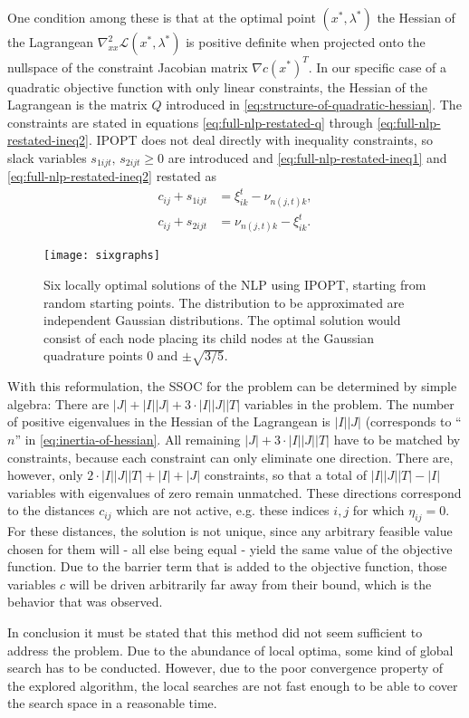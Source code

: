 One condition among these is that at the optimal point $\left(x^*,\lambda^*\right)$ the Hessian of the Lagrangean $\nabla_{xx}^2\mathcal{L}(x^*,\lambda^*)$ is positive definite when projected onto the nullspace of the constraint Jacobian matrix $\nabla c(x^*)^T$. In our specific case of a quadratic objective function with only linear constraints, the Hessian of the Lagrangean is the matrix $Q$ introduced in \eqref{eq:structure-of-quadratic-hessian}. The constraints are stated in equations \eqref{eq:full-nlp-restated-q} through \eqref{eq:full-nlp-restated-ineq2}. IPOPT does not deal directly with inequality constraints, so slack variables $s_{1ijt},\,s_{2ijt} \geq 0$ are introduced and \eqref{eq:full-nlp-restated-ineq1} and \eqref{eq:full-nlp-restated-ineq2} restated as
\begin{subequations}
\begin{align}
  \label{eq:nlp-ineq1-with-slacks}
  c_{ij} +s_{1ijt}&= \xi_{ik}^t - \nu_{n(j,t)k},\\
  c_{ij} +s_{2ijt} &= \nu_{n(j,t)k} - \xi_{ik}^t.
\end{align}
\end{subequations}
\begin{figure}
  \centering
  \texttt{[image: sixgraphs]}
  \caption{Six locally optimal solutions of the NLP using IPOPT, starting from random starting points. The distribution to be approximated are independent Gaussian distributions. The optimal solution would consist of each node placing its child nodes at the Gaussian quadrature points $0$ and $\pm\sqrt{3/5}$.}
  \label{fig:different-local-minima-with-ipopt}
\end{figure}
With this reformulation, the SSOC for the problem can be determined by simple algebra: There are $|J|+|I||J|+3\cdot|I||J||T|$ variables in the problem. The number of positive eigenvalues in the Hessian of the Lagrangean is $|I||J|$ (corresponds to ``$n$'' in \eqref{eq:inertia-of-hessian}. All remaining $|J|+3\cdot|I||J||T|$ have to be matched by constraints, because each constraint can only eliminate one direction. There are, however, only $2\cdot|I||J||T|+|I|+|J|$ constraints, so that a total of $|I||J||T|-|I|$ variables with eigenvalues of zero remain unmatched. These directions correspond to the distances $c_{ij}$ which are not active, e.g. these indices $i,j$ for which $\eta_{ij}=0$. For these distances, the solution is not unique, since any arbitrary feasible value chosen for them will - all else being equal - yield the same value of the objective function. Due to the barrier term that is added to the objective function, those variables $c$ will be driven arbitrarily far away from their bound, which is the behavior that was observed.

In conclusion it must be stated that this method did not seem sufficient to address the problem. Due to the abundance of local optima, some kind of global search has to be conducted. However, due to the poor convergence property of the explored algorithm, the local searches are not fast enough to be able to cover the search space in a reasonable time.
